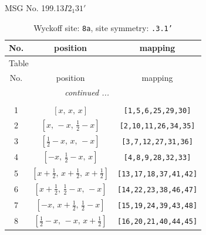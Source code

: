 \documentclass[fleqn,8pt]{jsarticle}
\begin{document}
\setcounter{MaxMatrixCols}{32}

\renewcommand{\tablename}{Table~}
\renewcommand{\figurename}{Figure~}
\begin{center}
\LARGE
MSG No. 199.13\quad$I2_{1}31'$
\end{center}
\renewcommand{\arraystretch}{1.2}
\begin{longtable}{ccc}
\caption{Wyckoff site: {\tt 8a}, site symmetry: {\tt .3.1'}}
 \\
 \hline \hline
No. & position & mapping \\ \hline \endfirsthead

\multicolumn{2}{l}{\tablename\ \thetable{}} \\
 \hline \hline
No. & position & mapping \\ \hline \endhead

 \hline \hline
\multicolumn{2}{r}{\footnotesize\it continued ...} \\ \endfoot

 \hline \hline
\multicolumn{2}{r}{} \\ \endlastfoot

1 & $\left[ x,\, x,\, x \right]$ & {\tt [1,5,6,25,29,30]} \\ \hline
2 & $\left[ x,\, - x,\, \frac{1}{2} - x \right]$ & {\tt [2,10,11,26,34,35]} \\ \hline
3 & $\left[ \frac{1}{2} - x,\, x,\, - x \right]$ & {\tt [3,7,12,27,31,36]} \\ \hline
4 & $\left[ - x,\, \frac{1}{2} - x,\, x \right]$ & {\tt [4,8,9,28,32,33]} \\ \hline
5 & $\left[ x + \frac{1}{2},\, x + \frac{1}{2},\, x + \frac{1}{2} \right]$ & {\tt [13,17,18,37,41,42]} \\ \hline
6 & $\left[ x + \frac{1}{2},\, \frac{1}{2} - x,\, - x \right]$ & {\tt [14,22,23,38,46,47]} \\ \hline
7 & $\left[ - x,\, x + \frac{1}{2},\, \frac{1}{2} - x \right]$ & {\tt [15,19,24,39,43,48]} \\ \hline
8 & $\left[ \frac{1}{2} - x,\, - x,\, x + \frac{1}{2} \right]$ & {\tt [16,20,21,40,44,45]} \\
\end{longtable}
\renewcommand{\arraystretch}{1.2}
\end{document}
